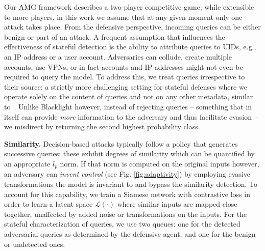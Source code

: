 Our AMG framework describes a two-player competitive game; while extensible to more players, in this work we assume that at any given moment only one attack takes place.
From the defensive perspective, incoming queries can be either benign or part of an attack.
A frequent assumption that influences the effectiveness of stateful detection is the ability to attribute queries to UIDs, e.g., an IP address or a user account.
Adversaries can collude, create multiple accounts, use VPNs, or in fact accounts and IP addresses might not even be required to query the model.
To address this, we treat queries irrespective to their source: a strictly more challenging setting for stateful defenses where we operate solely on the content of queries and not on any other metadata, similar to~\cite{li2022blacklight}.
Unlike Blacklight however, instead of rejecting queries -- something that in itself can provide \textit{more} information to the adversary and thus facilitate evasion \cite{feng2023stateful} -- we misdirect by returning the second highest probability class.

\textbf{Similarity.} Decision-based attacks typically follow a policy that generates successive queries: these exhibit degrees of similarity which can be quantified by an appropriate $l_p$ norm.
If that norm is computed on the original inputs however, an adversary can \textit{invent control} (see Fig. \ref{fig:adaptivity}) by employing evasive transformations the model is invariant to and bypass the similarity detection.
To account for this capability, we train a Siamese network with contrastive loss in order to learn a latent space $\mathcal{L}(\cdot)$ where similar inputs are mapped close together, unaffected by added noise or transformations on the inputs.
For the stateful characterization of queries, we use two queues: one for the detected adversarial queries as determined by the defensive agent, and one for the benign or undetected ones.


